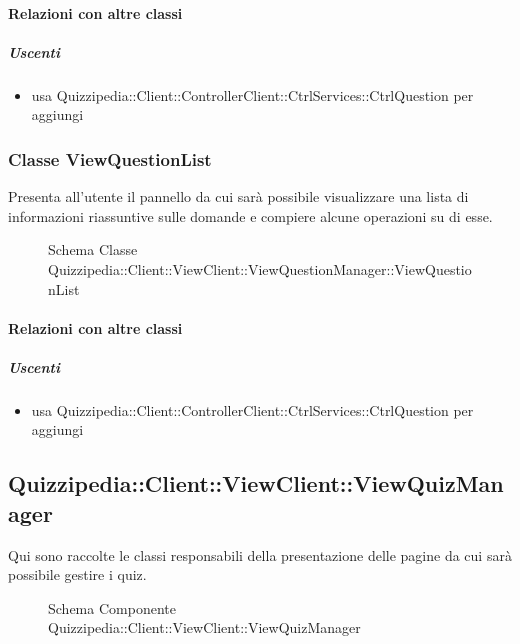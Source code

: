 \paragraph{Relazioni con altre classi}
\subparagraph{Uscenti}
\begin{itemize}
\item usa Quizzipedia::Client::ControllerClient::CtrlServices::CtrlQuestion per aggiungi
\end{itemize}
\subsubsection{Classe ViewQuestionList}
Presenta all'utente il pannello da cui sarà possibile visualizzare una lista di informazioni riassuntive sulle domande e compiere alcune operazioni su di esse.
\begin{figure}[H]
\centering
\noindent{}
\caption[Schema Classe ViewQuestionList]{Schema Classe Quizzipedia::Client::ViewClient::ViewQuestionManager::ViewQuestionList}
\end{figure}
\paragraph{Relazioni con altre classi}
\subparagraph{Uscenti}
\begin{itemize}
\item usa Quizzipedia::Client::ControllerClient::CtrlServices::CtrlQuestion per aggiungi
\end{itemize}
\subsection{Quizzipedia::Client::ViewClient::ViewQuizManager}
Qui sono raccolte le classi responsabili della presentazione delle pagine da cui sarà possibile gestire i quiz.
\begin{figure}[H]
\centering
\noindent{}
\caption[Schema Componente Quizzipedia::Client::ViewClient::ViewQuizManager]{Schema Componente Quizzipedia::Client::ViewClient::ViewQuizManager}
\end{figure}
